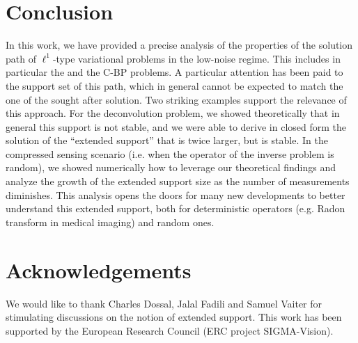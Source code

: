 
\section*{Conclusion}

In this work, we have provided a precise analysis of the properties of the solution path of $\ell^1$-type variational problems in the low-noise regime. This includes in particular the \lasso and the C-BP problems. A particular attention has been paid to the support set of this path, which in general cannot be expected to match the one of the sought after solution. Two striking examples support the relevance of this approach. For the deconvolution problem, we showed theoretically that in general this support is not stable, and we were able to derive in closed form the solution of the ``extended support'' that is twice larger, but is stable. In the compressed sensing scenario (i.e. when the operator of the inverse problem is random), we showed numerically how to leverage our theoretical findings and analyze the growth of the extended support size as the number of measurements diminishes. This analysis opens the doors for many new developments to better understand this extended support, both for deterministic operators (e.g. Radon transform in medical imaging) and random ones.  


\section*{Acknowledgements} 

We would like to thank Charles Dossal, Jalal Fadili and Samuel Vaiter for stimulating discussions on the notion of extended support. This work has been supported by the European Research Council (ERC project SIGMA-Vision).

